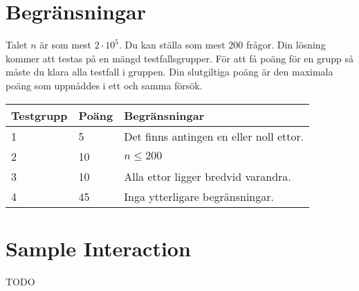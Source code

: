 \section*{Begränsningar}
Talet $n$ är som mest $2 \cdot 10^5$. Du kan ställa som mest $200$ frågor.
Din lösning kommer att testas på en mängd testfallsgrupper.
För att få poäng för en grupp så måste du klara alla testfall i gruppen.
Din slutgiltiga poäng är den maximala poäng som uppnåddes i ett och samma försök.

\noindent
\begin{tabular}{| l | l | l |}
\hline
Testgrupp & Poäng & Begränsningar \\ \hline
1     & 5     & Det finns antingen en eller noll ettor. \\ \hline
2     & 10    & $n \leq 200$ \\ \hline
3     & 10    & Alla ettor ligger bredvid varandra. \\ \hline
4     & 45    & Inga ytterligare begränsningar. \\ \hline
\end{tabular}

\section*{Sample Interaction}
TODO
